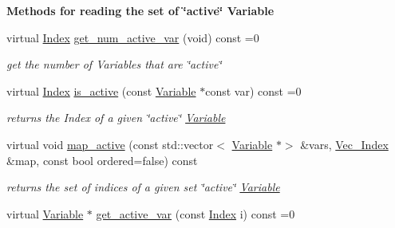\begin{Indent}\textbf{ Methods for reading the set of \char`\"{}active\char`\"{} Variable}\par
\begin{DoxyCompactItemize}
\item 
virtual \mbox{\hyperlink{group___thin_var_dep_interface___c_l_a_s_s_e_s_gad53d6229d7ec28555a9c9c2fd9abf773}{Index}} \mbox{\hyperlink{group___thin_var_dep_interface___c_l_a_s_s_e_s_ga6dbf09c17736b358d11f617e15856981}{get\+\_\+num\+\_\+active\+\_\+var}} (void) const =0
\begin{DoxyCompactList}\small\item\em get the number of Variables that are \char`\"{}active\char`\"{} \end{DoxyCompactList}\item 
virtual \mbox{\hyperlink{group___thin_var_dep_interface___c_l_a_s_s_e_s_gad53d6229d7ec28555a9c9c2fd9abf773}{Index}} \mbox{\hyperlink{group___thin_var_dep_interface___c_l_a_s_s_e_s_ga05297a4e506f89ec692a01aca971ce2d}{is\+\_\+active}} (const \mbox{\hyperlink{class_s_m_spp__di__unipi__it_1_1_variable}{Variable}} $\ast$const var) const =0
\begin{DoxyCompactList}\small\item\em returns the Index of a given \char`\"{}active\char`\"{} \mbox{\hyperlink{class_s_m_spp__di__unipi__it_1_1_variable}{Variable}} \end{DoxyCompactList}\item 
virtual void \mbox{\hyperlink{group___thin_var_dep_interface___c_l_a_s_s_e_s_ga88e11e9f684f5ac81df04df1cf14a423}{map\+\_\+active}} (const std\+::vector$<$ \mbox{\hyperlink{class_s_m_spp__di__unipi__it_1_1_variable}{Variable}} $\ast$$>$ \&vars, \mbox{\hyperlink{group___thin_var_dep_interface___c_l_a_s_s_e_s_ga9a1284953e2aa5222b5867c0a7f98499}{Vec\+\_\+\+Index}} \&map, const bool ordered=false) const
\begin{DoxyCompactList}\small\item\em returns the set of indices of a given set \char`\"{}active\char`\"{} \mbox{\hyperlink{class_s_m_spp__di__unipi__it_1_1_variable}{Variable}} \end{DoxyCompactList}\item 
virtual \mbox{\hyperlink{class_s_m_spp__di__unipi__it_1_1_variable}{Variable}} $\ast$ \mbox{\hyperlink{group___thin_var_dep_interface___c_l_a_s_s_e_s_ga1967518603f9424434460d4ba8676c37}{get\+\_\+active\+\_\+var}} (const \mbox{\hyperlink{group___thin_var_dep_interface___c_l_a_s_s_e_s_gad53d6229d7ec28555a9c9c2fd9abf773}{Index}} i) const =0
$$
\end{DoxyCompactItemize}
\end{Indent}
